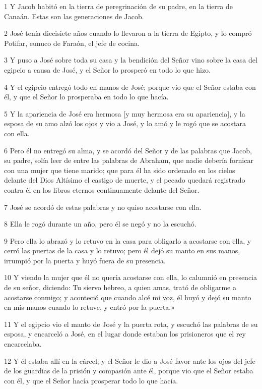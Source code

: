 \par 1 Y Jacob habitó en la tierra de peregrinación de su padre, en la tierra de Canaán. Estas son las generaciones de Jacob.
\par 2 José tenía diecisiete años cuando lo llevaron a la tierra de Egipto, y lo compró Potifar, eunuco de Faraón, el jefe de cocina.
\par 3 Y puso a José sobre toda su casa y la bendición del Señor vino sobre la casa del egipcio a causa de José, y el Señor lo prosperó en todo lo que hizo.
\par 4 Y el egipcio entregó todo en manos de José; porque vio que el Señor estaba con él, y que el Señor lo prosperaba en todo lo que hacía.
\par 5 Y la apariencia de José era hermosa [y muy hermosa era su apariencia], y la esposa de su amo alzó los ojos y vio a José, y lo amó y le rogó que se acostara con ella.
\par 6 Pero él no entregó su alma, y ​​se acordó del Señor y de las palabras que Jacob, su padre, solía leer de entre las palabras de Abraham, que nadie debería fornicar con una mujer que tiene marido; que para él ha sido ordenado en los cielos delante del Dios Altísimo el castigo de muerte, y el pecado quedará registrado contra él en los libros eternos continuamente delante del Señor.
\par 7 José se acordó de estas palabras y no quiso acostarse con ella.
\par 8 Ella le rogó durante un año, pero él se negó y no la escuchó.
\par 9 Pero ella lo abrazó y lo retuvo en la casa para obligarlo a acostarse con ella, y cerró las puertas de la casa y lo retuvo; pero él dejó su manto en sus manos, irrumpió por la puerta y huyó fuera de su presencia.
\par 10 Y viendo la mujer que él no quería acostarse con ella, lo calumnió en presencia de su señor, diciendo: Tu siervo hebreo, a quien amas, trató de obligarme a acostarse conmigo; y aconteció que cuando alcé mi voz, él huyó y dejó su manto en mis manos cuando lo retuve, y entró por la puerta.»
\par 11 Y el egipcio vio el manto de José y la puerta rota, y escuchó las palabras de su esposa, y encarceló a José, en el lugar donde estaban los prisioneros que el rey encarcelaba.
\par 12 Y él estaba allí en la cárcel; y el Señor le dio a José favor ante los ojos del jefe de los guardias de la prisión y compasión ante él, porque vio que el Señor estaba con él, y que el Señor hacía prosperar todo lo que hacía.

